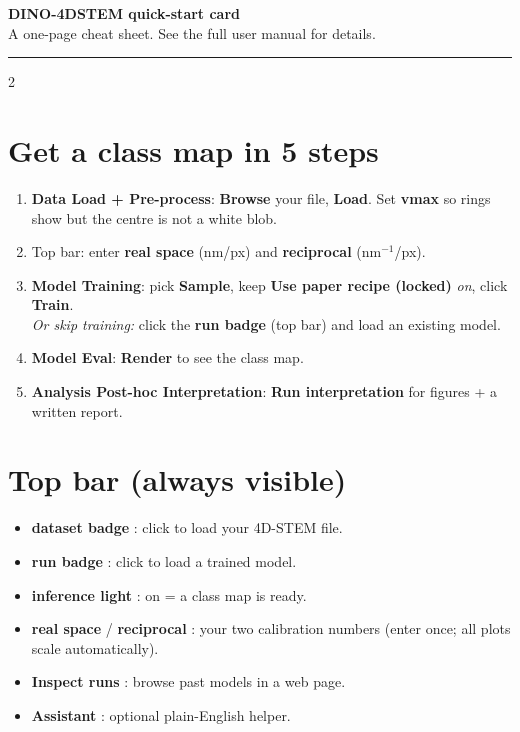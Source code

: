 \documentclass[10pt]{article}
\newcommand{\btn}[1]{\textbf{#1}}
\newcommand{\tabn}[1]{\textsf{\textbf{#1}}}
\begin{document}
\begin{center}
{\LARGE\bfseries\color{deep} DINO-4DSTEM quick-start card}\\[2pt]
{\small A one-page cheat sheet. See the full user manual for details.}
\end{center}
\vspace{2pt}
\hrule
\vspace{6pt}

\begin{multicols}{2}

\section{Get a class map in 5 steps}
\begin{enumerate}
\item \tabn{Data \textrightarrow{} Load + Pre-process}: \btn{Browse} your file,
\btn{Load}. Set \btn{vmax} so rings show but the centre is not a white blob.
\item Top bar: enter \btn{real space} (nm/px) and \btn{reciprocal} (nm$^{-1}$/px).
\item \tabn{Model \textrightarrow{} Training}: pick \btn{Sample}, keep
\btn{Use paper recipe (locked)} \emph{on}, click \btn{Train}.\\
\emph{Or skip training:} click the \btn{run badge} (top bar) and load an existing
model.
\item \tabn{Model \textrightarrow{} Eval}: \btn{Render} to see the class map.
\item \tabn{Analysis \textrightarrow{} Post-hoc \textrightarrow{} Interpretation}:
\btn{Run interpretation} for figures + a written report.
\end{enumerate}

\section{Top bar (always visible)}
\begin{itemize}
\item \btn{dataset badge} : click to load your 4D-STEM file.
\item \btn{run badge} : click to load a trained model.
\item \btn{inference light} : on = a class map is ready.
\item \btn{real space} / \btn{reciprocal} : your two calibration numbers (enter
once; all plots scale automatically).
\item \btn{Inspect runs} : browse past models in a web page.
\item \btn{Assistant} : optional plain-English helper.
\end{itemize}


\end{multicols}
\end{document}
